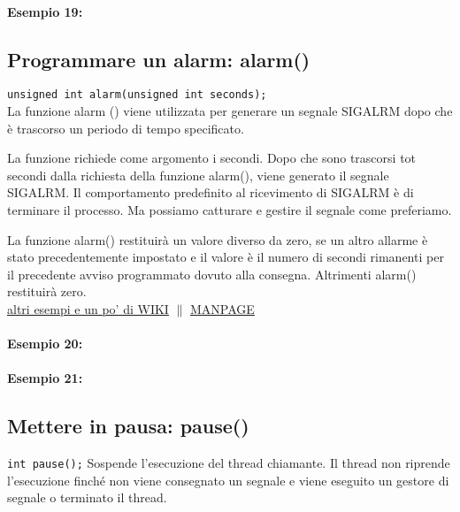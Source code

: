 \paragraph{Esempio 19:}\hfill \break


\subsection{Programmare un alarm: alarm()}
\texttt{unsigned int alarm(unsigned int seconds);}\\
La funzione alarm () viene utilizzata per generare un segnale SIGALRM dopo che è trascorso un periodo di tempo specificato.

La funzione richiede come argomento i secondi. Dopo che sono trascorsi tot secondi dalla richiesta della funzione alarm(), viene generato il segnale SIGALRM. Il comportamento predefinito al ricevimento di SIGALRM è di terminare il processo. Ma possiamo catturare e gestire il segnale come preferiamo.

La funzione alarm() restituirà un valore diverso da zero, se un altro allarme è stato precedentemente impostato e il valore è il numero di secondi rimanenti per il precedente avviso programmato dovuto alla consegna. Altrimenti alarm() restituirà zero.\\
\href{https://linuxhint.com/sigalarm_alarm_c_language/}{altri esempi e un po' di WIKI} $\|$ \href{https://www.man7.org/linux/man-pages/man2/alarm.2.html}{MANPAGE}

\paragraph{Esempio 20:}\hfill \break


\paragraph{Esempio 21:}\hfill \break


\subsection{Mettere in pausa: pause()}
\texttt{int pause();}
Sospende l'esecuzione del thread chiamante. Il thread non riprende l'esecuzione finché non viene consegnato un segnale e viene eseguito un gestore di segnale o terminato il thread.

